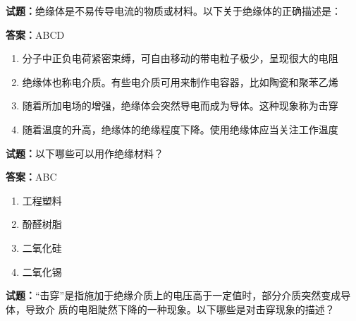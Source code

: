 \documentclass{ctexbook}
\begin{document}




\vspace{1em}

\textbf{试题：}绝缘体是不易传导电流的物质或材料。以下关于绝缘体的正确描述是： 

\textbf{答案：}ABCD 

\begin{enumerate}[leftmargin=3em]
  \item 分子中正负电荷紧密束缚，可自由移动的带电粒子极少，呈现很大的电阻 

  \item 绝缘体也称电介质。有些电介质可用来制作电容器，比如陶瓷和聚苯乙烯 

  \item 随着所加电场的增强，绝缘体会突然导电而成为导体。这种现象称为击穿 

  \item 随着温度的升高，绝缘体的绝缘程度下降。使用绝缘体应当关注工作温度 

\end{enumerate}





\vspace{1em}

\textbf{试题：}以下哪些可以用作绝缘材料？ 

\textbf{答案：}ABC 


\begin{enumerate}[leftmargin=3em]
  \item 工程塑料 

  \item 酚醛树脂 

  \item 二氧化硅 

  \item 二氧化锡 

\end{enumerate}





\vspace{1em}

\textbf{试题：}“击穿”是指施加于绝缘介质上的电压高于一定值时，部分介质突然变成导体，导致介
质的电阻陡然下降的一种现象。以下哪些是对击穿现象的描述？ 
\end{document}
